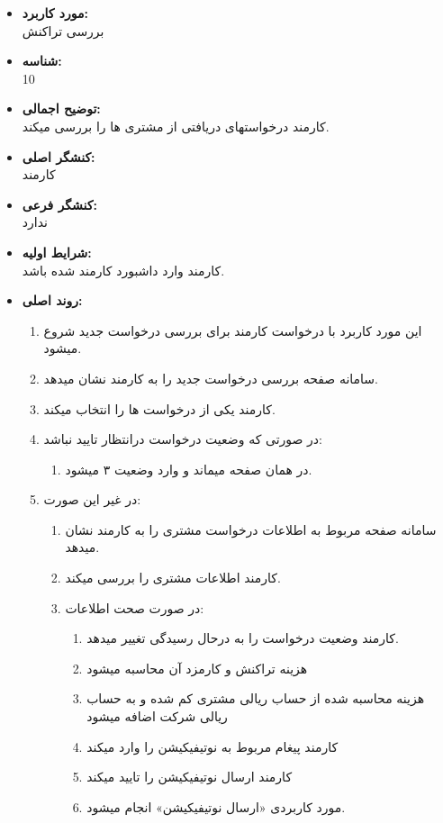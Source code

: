 \documentclass{article}
\begin{document}
\begin{itemize}
\item \textbf{مورد کاربرد:}\\
بررسی تراکنش
\item \textbf{شناسه:}\\
10
\item \textbf{توضیح اجمالی:}\\
کارمند درخواستهای دریافتی از مشتری ها را بررسی میکند.
\item \textbf{کنشگر اصلی:}\\
کارمند
\item \textbf{کنشگر فرعی:}\\
ندارد
\item \textbf{شرایط اولیه:}\\
کارمند وارد داشبورد کارمند شده باشد.
\item \textbf{روند اصلی:}\\
\begin{enumerate}
\item  این مورد کاربرد با درخواست کارمند برای بررسی درخواست جدید شروع میشود.
\item سامانه صفحه بررسی درخواست جدید را به کارمند نشان میدهد.
\item کارمند یکی از درخواست ها را انتخاب میکند.
\item در صورتی که وضعیت درخواست درانتظار تایید نباشد:
\begin{enumerate}
\item در همان صفحه میماند و وارد وضعیت ۳ میشود.
\end{enumerate}
\item در غیر این صورت:
\begin{enumerate}
\item سامانه صفحه مربوط به اطلاعات درخواست مشتری را به کارمند نشان میدهد.
\item کارمند اطلاعات مشتری را بررسی میکند.
\item در صورت صحت اطلاعات:
\begin{enumerate}
\item کارمند وضعیت درخواست را به درحال رسیدگی تغییر میدهد.
\item هزینه تراکنش و کارمزد آن محاسبه میشود
\item هزینه محاسبه شده از حساب ریالی مشتری کم شده و به حساب ریالی شرکت اضافه میشود
\item کارمند پیغام مربوط به نوتیفیکیشن را وارد میکند
\item کارمند ارسال نوتیفیکیشن را تایید میکند
\item مورد کاربردی  «ارسال نوتیفیکیشن» انجام میشود.

\end{enumerate}
\end{enumerate}
\end{enumerate}
\end{itemize}
\end{document}
